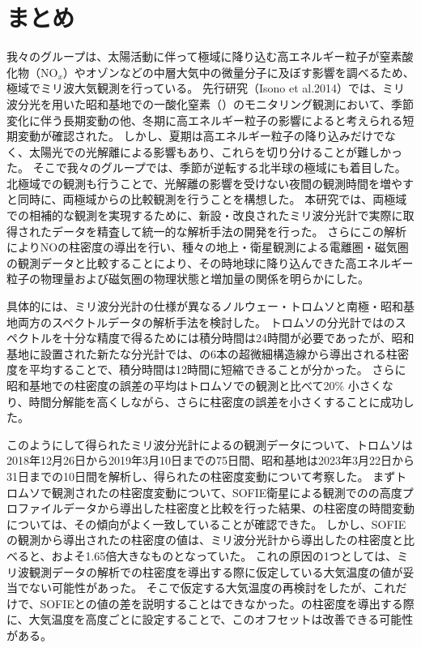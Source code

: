 \chapter{まとめ}
我々のグループは、太陽活動に伴って極域に降り込む高エネルギー粒子が窒素酸化物（$\mathrm{NO}_x$）やオゾンなどの中層大気中の微量分子に及ぼす影響を調べるため、極域でミリ波大気観測を行っている。
先行研究（Isono et al.2014）では、ミリ波分光を用いた昭和基地での一酸化窒素（）のモニタリング観測において、季節変化に伴う長期変動の他、冬期に高エネルギー粒子の影響によると考えられる短期変動が確認された。
しかし、夏期は高エネルギー粒子の降り込みだけでなく、太陽光での光解離による影響もあり、これらを切り分けることが難しかった。
そこで我々のグループでは、季節が逆転する北半球の極域にも着目した。
北極域での観測も行うことで、光解離の影響を受けない夜間の観測時間を増やすと同時に、両極域からの比較観測を行うことを構想した。
本研究では、両極域での相補的な観測を実現するために、新設・改良されたミリ波分光計で実際に取得されたデータを精査して統一的な解析手法の開発を行った。
さらにこの解析によりNOの柱密度の導出を行い、種々の地上・衛星観測による電離圏・磁気圏の観測データと比較することにより、その時地球に降り込んできた高エネルギー粒子の物理量および磁気圏の物理状態と増加量の関係を明らかにした。\par

具体的には、ミリ波分光計の仕様が異なるノルウェー・トロムソと南極・昭和基地両方のスペクトルデータの解析手法を検討した。
トロムソの分光計ではのスペクトルを十分な精度で得るためには積分時間は24時間が必要であったが、昭和基地に設置された新たな分光計では、の6本の超微細構造線から導出される柱密度を平均することで、積分時間は12時間に短縮できることが分かった。
さらに昭和基地での柱密度の誤差の平均はトロムソでの観測と比べて20\% 小さくなり、時間分解能を高くしながら、さらに柱密度の誤差を小さくすることに成功した。\par

このようにして得られたミリ波分光計によるの観測データについて、トロムソは2018年12月26日から2019年3月10日までの75日間、昭和基地は2023年3月22日から31日までの10日間を解析し、得られたの柱密度変動について考察した。
まずトロムソで観測されたの柱密度変動について、SOFIE衛星による観測でのの高度プロファイルデータから導出した柱密度と比較を行った結果、の柱密度の時間変動については、その傾向がよく一致していることが確認できた。
しかし、SOFIEの観測から導出されたの柱密度の値は、ミリ波分光計から導出したの柱密度と比べると、およそ1.65倍大きなものとなっていた。
これの原因の1つとしては、ミリ波観測データの解析での柱密度を導出する際に仮定している大気温度の値が妥当でない可能性があった。
そこで仮定する大気温度の再検討をしたが、これだけで、SOFIEとの値の差を説明することはできなかった。の柱密度を導出する際に、大気温度を高度ごとに設定することで、このオフセットは改善できる可能性がある。\par

